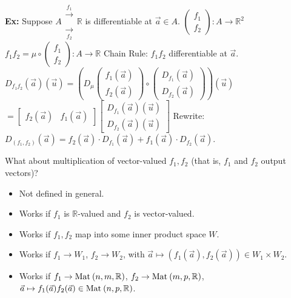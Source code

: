 \documentclass[10pt,letterpaper]{article}
\newcommand{\n}{\hfill\break}
\newcommand{\ex}[1]{\par\noindent\settowidth{\hangindent}{\textbf{Ex: }}\textbf{Ex: }#1\n}
\newcommand{\ptxt}[1]{\textrm{\textnormal{#1}}}
\newcommand{\reals}{\mathbb{R}}
\newcommand{\R}{\reals}
\newcommand{\of}{\circ}
\newcommand{\Mat}{\ptxt{Mat}\>}
\begin{document}
\ex{Suppose $A\begin{array}{ll}\xrightarrow[]{f_{1}}\\ \xrightarrow[f_{2}]{}\end{array}\R$ is differentiable at $\vec{a}\in{}A$.\n
$\left(\begin{array}{l}f_{1}\\ f_{2}\end{array}\right):A\to\R^{2}$\n
$f_{1}f_{2}=\mu\of\left(\begin{array}{l}f_{1}\\ f_{2}\end{array}\right):A\to\R$\n
\n
Chain Rule: $f_{1}f_{2}$ differentiable at $\vec{a}$.\n
$D_{f_{1}f_{2}}(\vec{a})(\vec{u})=\left(D_{\mu}\left(\begin{array}{l}f_{1}(\vec{a})\\ f_{2}(\vec{a})\end{array}\right)\of\left(\begin{array}{l}D_{f_{1}}(\vec{a})\\ D_{f_{2}}(\vec{a})\end{array}\right)\right)(\vec{u})$\n
\phantom{$D_{f_{1}f_{2}}(\vec{a})(\vec{u})$}${}=\left[\begin{array}{ll}f_{2}(\vec{a}) & f_{1}(\vec{a})\end{array}\right]\left[\begin{array}{l}D_{f_{1}}(\vec{a})(\vec{u})\\ D_{f_{2}}(\vec{a})(\vec{u})\end{array}\right]$\n
Rewrite: $D_{(f_{1},f_{2})}(\vec{a})=f_{2}(\vec{a})\cdot{}D_{f_{1}}(\vec{a})+f_{1}(\vec{a})\cdot{}D_{f_{2}}(\vec{a})$.}

\par\noindent What about multiplication of vector-valued $f_{1},f_{2}$ (that is, $f_{1}$ and $f_{2}$ output vectors)?\n

\begin{itemize}
	\item Not defined in general.
	\item Works if $f_{1}$ is $\R$-valued and $f_{2}$ is vector-valued.
	\item Works if $f_{1},f_{2}$ map into some inner product space $W$.
	\item Works if $f_{1}\to{}W_{1}$, $f_{2}\to{}W_{2}$, with $\vec{a}\mapsto(f_{1}(\vec{a}),f_{2}(\vec{a}))\in{}W_{1}\times{}W_{2}$.
	\item Works if $f_{1}\to\Mat(n,m,\R)$, $f_{2}\to\Mat(m,p,\R)$, $\vec{a}\mapsto{}f_{1}(\vec{a})f_{2}(\vec{a})\in\Mat(n,p,\R)$.
\end{itemize}
\end{document}
